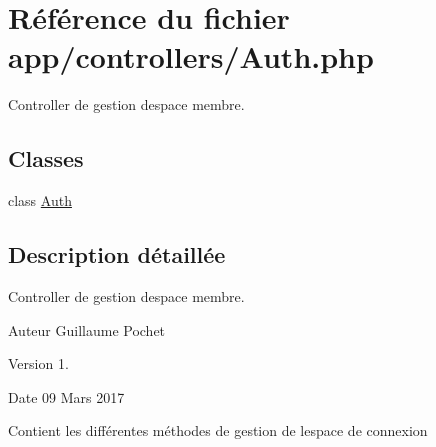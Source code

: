 \hypertarget{_auth_8php}{}\section{Référence du fichier app/controllers/\+Auth.php}
\label{_auth_8php}


Controller de gestion d\textquotesingle{}espace membre.  


\subsection*{Classes}
\begin{DoxyCompactItemize}
\item 
class \hyperlink{class_auth}{Auth}
\end{DoxyCompactItemize}


\subsection{Description détaillée}
Controller de gestion d\textquotesingle{}espace membre. 

\begin{DoxyAuthor}{Auteur}
Guillaume Pochet 
\end{DoxyAuthor}
\begin{DoxyVersion}{Version}
1. 
\end{DoxyVersion}
\begin{DoxyDate}{Date}
09 Mars 2017
\end{DoxyDate}
Contient les différentes méthodes de gestion de l\textquotesingle{}espace de connexion 